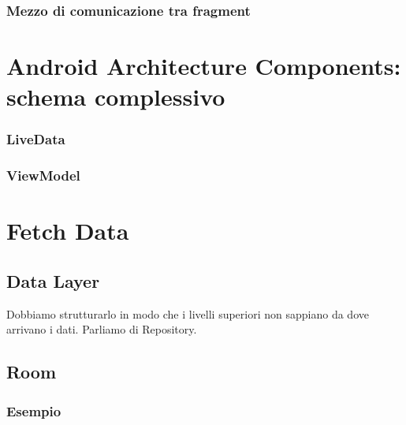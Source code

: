 \subsubsection{Mezzo di comunicazione tra fragment}

\section{Android Architecture Components: schema complessivo}
\subsubsection{LiveData}

\subsubsection{ViewModel}

\section{Fetch Data}
\subsection{Data Layer}
\par Dobbiamo strutturarlo in modo che i livelli superiori non sappiano da dove arrivano i dati. Parliamo di Repository.

\subsection{Room}

\subsubsection{Esempio}



